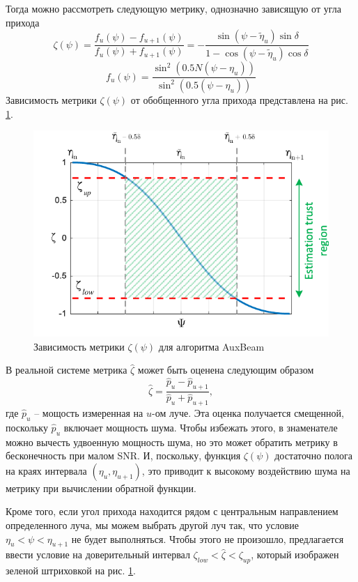 Тогда можно рассмотреть следующую метрику, однозначно зависящую от угла прихода
\begin{equation}
    \label{eq:4.37}
    \zeta(\psi) = \frac{f_u(\psi) - f_{u+1}(\psi)}{f_u(\psi) + f_{u+1}(\psi)} = - \frac{\sin(\psi - \tilde \eta_u) \sin \delta}{1 - \cos(\psi - \tilde \eta_u) \cos \delta}
\end{equation}
\begin{equation}
    \label{eq:4.38}
    f_u(\psi) = \frac{\sin^2 (0.5 N (\psi - \eta_u))}{\sin^2(0.5 (\psi - \eta_u))}
\end{equation}
Зависимость метрики $\zeta(\psi)$  от обобщенного угла прихода представлена на
рис. \ref{fig:4.15}.
\begin{figure}[ht]
    \centering
    \includegraphics[width=0.5\linewidth]{figs/fig4.15}
    \caption{Зависимость метрики $\zeta(\psi)$ для алгоритма AuxBeam}
    \label{fig:4.15}
\end{figure}
В реальной системе метрика $\hat \zeta$ может быть оценена следующим образом
\begin{equation}
    \label{eq:4.39}
    \hat \zeta = \frac{\hat p_u - \hat p_{u+1}}{ \hat p_u + \hat p_{u+1} },
\end{equation}
где $\hat p_u$ -- мощость измеренная на $u$-ом луче. Эта оценка получается смещенной, поскольку $\hat p_u$ включает мощность шума.
Чтобы избежать этого, в знаменателе можно вычесть удвоенную мощность шума, но это может обратить метрику в бесконечность при малом SNR.
И, поскольку, функция $\zeta(\psi)$ достаточно полога на краях интервала $(\eta_u, \eta_{u+1})$, это приводит к высокому
воздействию шума на метрику при вычислении обратной функции.

Кроме того, если угол прихода находится рядом с центральным направлением определенного
луча, мы можем выбрать другой луч так, что условие $\eta_u<\psi < \eta_{u+1}$ не будет выполняться.
Чтобы этого не произошло, предлагается ввести условие на доверительный интервал
$\zeta_{low}<\hat \zeta < \zeta_{up}$, который изображен зеленой штриховкой  на рис.
\ref{fig:4.15}.

